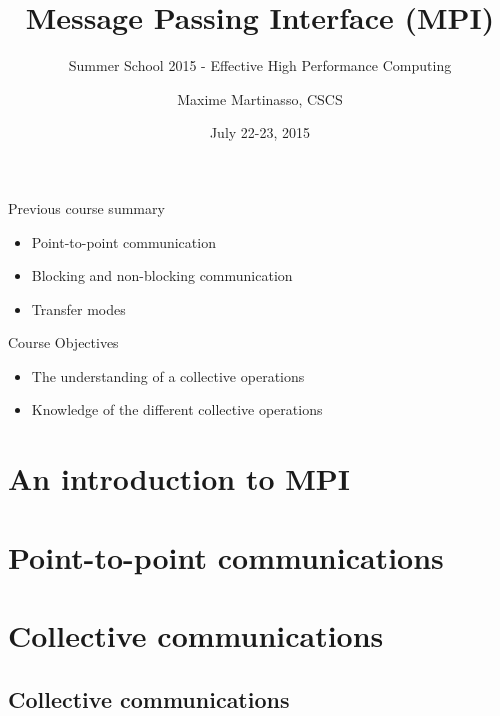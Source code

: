 \documentclass[aspectratio=43]{beamer}
\author{Maxime Martinasso, CSCS}
\title{Message Passing Interface (MPI)}
\subtitle{Summer School 2015 - Effective High Performance Computing}
\date{July 22-23, 2015}
\begin{document}
\cscstitle

\begin{frame}{Previous course summary}
\begin{itemize}
\item Point-to-point communication
\item Blocking and non-blocking communication
\item Transfer modes
\end{itemize}
\end{frame}

\begin{frame}{Course Objectives}
\begin{itemize}
\item The understanding of a collective operations
\item Knowledge of the different collective operations
\end{itemize}
\end{frame}


\section{An introduction to MPI}
\section{Point-to-point communications}
\section{Collective communications}


\subsection{Collective communications}
\end{document}
